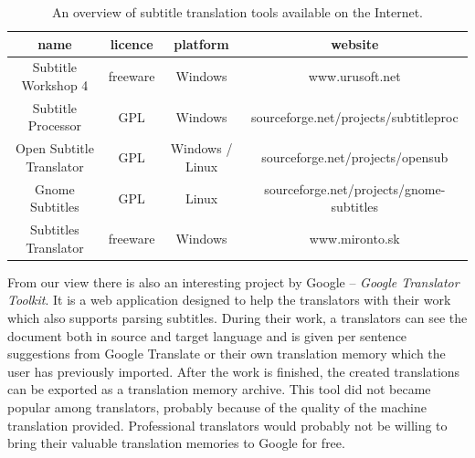 \begin{table}[h]

\begin{center}
\begin{tabular}{|c|c|c|c|}
\hline
\bf name & \bf licence & \bf platform & \bf website \\
\hline
Subtitle Workshop 4 & freeware & Windows & www.urusoft.net \\
\hline
Subtitle Processor & GPL & Windows & sourceforge.net/projects/subtitleproc \\
\hline
Open Subtitle Translator & GPL & Windows / Linux & sourceforge.net/projects/opensub \\
\hline
Gnome Subtitles & GPL & Linux & sourceforge.net/projects/gnome-subtitles \\
\hline
Subtitles Translator & freeware & Windows & www.mironto.sk \\ \hline

\end{tabular}
\end{center}

\caption{An overview of subtitle translation tools available on the Internet.} \label{subtitles_tools}
\end{table}

From our view there is also an interesting project by Google -- \emph{Google Translator Toolkit}. It is a web application designed to help the translators with their work which also supports parsing subtitles. During their work, a translators can see the document both in source and target language and is given per sentence suggestions from Google Translate or their own translation memory which the user has previously imported. After the work is finished, the created translations can be exported as a translation memory archive. This tool did not became popular among translators, probably because of the quality of the machine translation provided. Professional translators would probably not be willing to bring their valuable translation memories to Google for free. 

